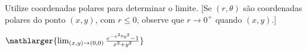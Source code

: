 Utilize coordenadas polares para determinar o limite. [Se $(r,\theta)$ são coordenadas polares do ponto $(x,y)$, com $r\leq 0$, observe que $r \rightarrow 0^+$ quando $(x,y)
$.]


\item$\mathlarger{\lim_{(x,y)\rightarrow(0,0)}  \frac{e^{-x^20y^2}-1}{x^2+y^2}}$